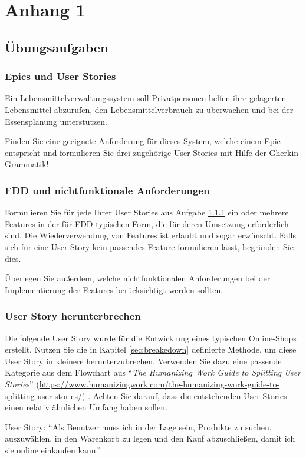 \documentclass[acmtog]{acmart}
\begin{document}



\appendix

\section{Anhang 1}

\subsection{Übungsaufgaben}
\subsubsection{Epics und User Stories}\label{aufg:epics-und-user-stories}
Ein Lebensmittelverwaltungssystem soll Privatpersonen helfen ihre gelagerten Lebensmittel abzurufen,
den Lebensmittelverbrauch zu überwachen und bei der Essensplanung unterstützen.

Finden Sie eine geeignete Anforderung für dieses System, welche einem Epic entspricht und formulieren Sie drei zugehörige
User Stories mit Hilfe der Gherkin-Grammatik!

\subsubsection{FDD und nichtfunktionale Anforderungen}
Formulieren Sie für jede Ihrer User Stories aus Aufgabe \ref{aufg:epics-und-user-stories} ein oder mehrere Features in der für FDD typischen Form, die für deren Umsetzung erforderlich sind. Die Wiederverwendung von Features ist erlaubt und sogar erwünscht. Falls sich für eine User Story kein passendes Feature formulieren lässt, begründen Sie dies.

Überlegen Sie außerdem, welche nichtfunktionalen Anforderungen bei der Implementierung der Features berücksichtigt werden sollten.

\subsubsection{User Story herunterbrechen}
Die folgende User Story wurde für die Entwicklung eines typischen Online-Shops erstellt. Nutzen Sie die in Kapitel \ref{sec:breakedown} definierte Methode,
um diese User Story in kleinere herunterzubrechen. Verwenden Sie dazu eine passende Kategorie aus dem Flowchart aus ``\emph{The Humanizing Work Guide to Splitting User Stories}'' (\url{https://www.humanizingwork.com/the-humanizing-work-guide-to-splitting-user-stories/}) \cite{humanizingwork}.
Achten Sie darauf, dass die entstehenden User Stories einen relativ ähnlichen Umfang haben sollen.

User Story:
``Als Benutzer muss ich in der Lage sein, Produkte zu suchen, auszuwählen, in den Warenkorb zu legen und den Kauf abzuschließen, damit ich sie online einkaufen kann.''
\end{document}
